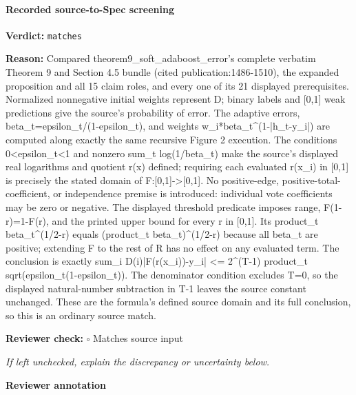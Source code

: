 \documentclass[10pt]{article}
\newcommand{\reviewerbox}{%
  \par\noindent\fbox{\parbox{0.96\linewidth}{\rule{0pt}{0.38in}}}\par
}
\newcommand{\reviewmatch}[1]{%
  \par\noindent\textbf{Reviewer check:} $\square$\; #1\par
  \noindent\emph{If left unchecked, explain the discrepancy or uncertainty below.}\par
}
\begin{document}
\paragraph{Recorded source-to-Spec screening}
\textbf{Verdict:} \texttt{matches}
\\
{\raggedright
\textbf{Reason:} Compared theorem9\_\allowbreak{}soft\_\allowbreak{}adaboost\_\allowbreak{}error's complete verbatim Theorem 9 and Section 4.\allowbreak{}5 bundle (cited publication:\allowbreak{}1486-\allowbreak{}1510), the expanded proposition and all 15 claim roles, and every one of its 21 displayed prerequisites.\allowbreak{} Normalized nonnegative initial weights represent D;\allowbreak{} binary labels and [0,1] weak predictions give the source's probability of error.\allowbreak{} The adaptive errors, beta\_\allowbreak{}t=epsilon\_\allowbreak{}t/\allowbreak{}(1-\allowbreak{}epsilon\_\allowbreak{}t), and weights w\_\allowbreak{}i*beta\_\allowbreak{}t\textasciicircum{}(1-\allowbreak{}|h\_\allowbreak{}t-\allowbreak{}y\_\allowbreak{}i|) are computed along exactly the same recursive Figure 2 execution.\allowbreak{} The conditions 0<epsilon\_\allowbreak{}t<1 and nonzero sum\_\allowbreak{}t log(1/\allowbreak{}beta\_\allowbreak{}t) make the source's displayed real logarithms and quotient r(x) defined;\allowbreak{} requiring each evaluated r(x\_\allowbreak{}i) in [0,1] is precisely the stated domain of F:\allowbreak{}[0,1]-\allowbreak{}>[0,1].\allowbreak{} No positive-\allowbreak{}edge, positive-\allowbreak{}total-\allowbreak{}coefficient, or independence premise is introduced:\allowbreak{} individual vote coefficients may be zero or negative.\allowbreak{} The displayed threshold predicate imposes range, F(1-\allowbreak{}r)=1-\allowbreak{}F(r), and the printed upper bound for every r in [0,1].\allowbreak{} Its product\_\allowbreak{}t beta\_\allowbreak{}t\textasciicircum{}(1/\allowbreak{}2-\allowbreak{}r) equals (product\_\allowbreak{}t beta\_\allowbreak{}t)\textasciicircum{}(1/\allowbreak{}2-\allowbreak{}r) because all beta\_\allowbreak{}t are positive;\allowbreak{} extending F to the rest of R has no effect on any evaluated term.\allowbreak{} The conclusion is exactly sum\_\allowbreak{}i D(i)|F(r(x\_\allowbreak{}i))-\allowbreak{}y\_\allowbreak{}i| <= 2\textasciicircum{}(T-\allowbreak{}1) product\_\allowbreak{}t sqrt(epsilon\_\allowbreak{}t(1-\allowbreak{}epsilon\_\allowbreak{}t)).\allowbreak{} The denominator condition excludes T=0, so the displayed natural-\allowbreak{}number subtraction in T-\allowbreak{}1 leaves the source constant unchanged.\allowbreak{} These are the formula's defined source domain and its full conclusion, so this is an ordinary source match.\allowbreak{}
\par}
\reviewmatch{Matches source input}
\noindent\textbf{Reviewer annotation}\par
\reviewerbox
\clearpage
\hypertarget{source-claim-e590fab8ff890880}{}
\end{document}
